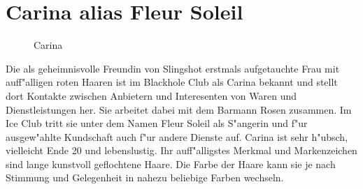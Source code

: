 \section{Carina alias Fleur Soleil}

\begin{figure}
    \caption{Carina}
\end{figure}

Die als geheimnisvolle Freundin von Slingshot erstmals aufgetauchte Frau mit auff"alligen roten Haaren ist im Blackhole Club als Carina bekannt und stellt dort Kontakte zwischen Anbietern und Interesenten von Waren und Dienstleistungen her. Sie arbeitet dabei mit dem Barmann Rosen zusammen. Im Ice Club tritt sie unter dem Namen Fleur Soleil als S"angerin und f"ur ausgew"ahlte Kundschaft auch f"ur andere Dienste auf. Carina ist sehr h"ubsch, vielleicht Ende 20 und lebenslustig. Ihr auff"alligstes Merkmal und Markenzeichen sind lange kunstvoll geflochtene Haare. Die Farbe der Haare kann sie je nach Stimmung und Gelegenheit in nahezu beliebige Farben wechseln.

